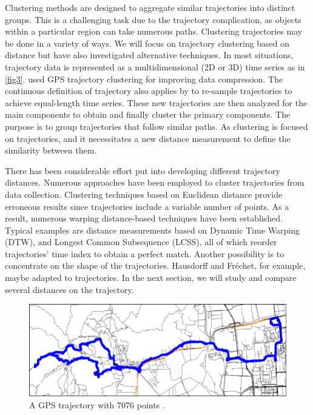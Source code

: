 \documentclass[a4paper, 12pt]{article}
\begin{document}
Clustering methods are designed to aggregate similar trajectories into distinct groups. This is a challenging task due to the trajectory complication, as objects within a particular region can take numerous paths. Clustering trajectories may be done in a variety of ways. We will focus on trajectory clustering based on distance but have also investigated alternative techniques. In most situations, trajectory data is represented as a multidimensional (2D or 3D) time series as in \autoref{fig3}. \cite{gaffney1999trajectory, vasquez2004motion, chen2012compression} used GPS trajectory clustering for improving data compression. The continuous definition of trajectory also applies by \cite{gariel2011trajectory} to re-sample trajectories to achieve equal-length time series. These new trajectories are then analyzed for the main components to obtain and finally cluster the primary components. The purpose is to group trajectories that follow similar paths. As clustering is focused on trajectories, and it necessitates a new distance measurement to define the similarity between them.

There has been considerable effort put into developing different trajectory distances. Numerous approaches have been employed to cluster trajectories from data collection. Clustering techniques based on Euclidean distance provide erroneous results since trajectories include a variable number of points. As a result, numerous warping distance-based techniques have been established. Typical examples are distance measurements based on Dynamic Time Warping (DTW), and Longest Common Subsequence (LCSS), all of which reorder trajectories' time index to obtain a perfect match. Another possibility is to concentrate on the shape of the trajectories. Hausdorff and Fréchet, for example, maybe adapted to trajectories. In the next section, we will study and compare several distances on the trajectory. 

\begin{figure}[ht]
    \centering
    \includegraphics[width=1\textwidth]{Trajectory.png}
    \caption{A GPS trajectory with 7076 points \citep{qian2017simplifying}.}
    \label{fig3}
\end{figure}
\end{document}
